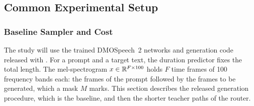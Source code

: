 \subsection{Common Experimental Setup}
\label{sec:setup}

\subsubsection{Baseline Sampler and Cost}
\label{sec:baseline}

The study will use the trained DMOSpeech~2 networks and generation code released with \textcite{li2025dmospeech2}. For a prompt and a target text, the duration predictor fixes the total length. The mel-spectrogram $x\in\mathbb{R}^{F\times 100}$ holds $F$ time frames of 100 frequency bands each: the frames of the prompt followed by the frames to be generated, which a mask $M$ marks. This section describes the released generation procedure, which is the baseline, and then the shorter teacher paths of the router.

